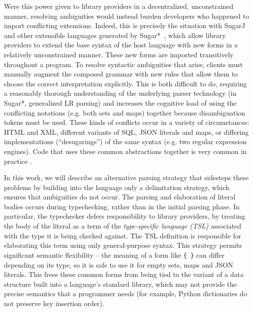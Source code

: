 Were this power given to library providers in a decentralized, unconstrained manner, resolving ambiguities would instead burden developers who happened to import conflicting extensions. Indeed, this is precisely the situation with SugarJ~\cite{Erdweg:2011:SLL:2048147.2048199} and other extensible languages generated by Sugar*~\cite{Erdweg:2013:FEL:2517208.2517210}, which allow library providers to extend the base syntax of the host language with new forms in a relatively unconstrained manner. These new forms are imported transitively throughout a program. To resolve syntactic ambiguities that arise, clients must manually augment the composed grammar with new rules that allow them to choose the correct interpretation explicitly. This is both difficult to do, requiring a reasonably thorough understanding of the underlying parser technology (in Sugar*, generalized LR parsing) and increases the cognitive load of using the conflicting notations (e.g. both sets and maps) together because disambiguation tokens must be used. These kinds of conflicts occur in a variety of circumstances: HTML and XML, different variants of SQL, JSON literals and maps, or differing implementations (``desugarings'') of the same syntax (e.g. two regular expression engines). Code that uses these common abstractions together is very common in practice \cite{Karakoidas:2014:DLU:2602518.2565878}. 

In this work, we will describe an alternative parsing strategy that sidesteps these problems by building into the language only a delimitation strategy, which ensures that ambiguities do not occur. The parsing and elaboration of literal bodies occurs during typechecking, rather than in the initial parsing phase. In particular, the typechecker defers responsibility to library providers, by treating the body of the literal as a term of the   \emph{type-specific language (TSL)} associated with the type it is being checked against. The TSL definition is responsible for elaborating this term using only general-purpose syntax. This strategy  permits significant semantic flexibility -- the meaning of a form like \verb|{ }| can differ depending  on its type, so it is safe to use it for empty sets, maps and JSON literals. This frees these common forms from being tied to the variant of a  data structure built into a language's standard library, which may not provide the precise semantics that a programmer needs (for example, Python dictionaries do not preserve key insertion order).

